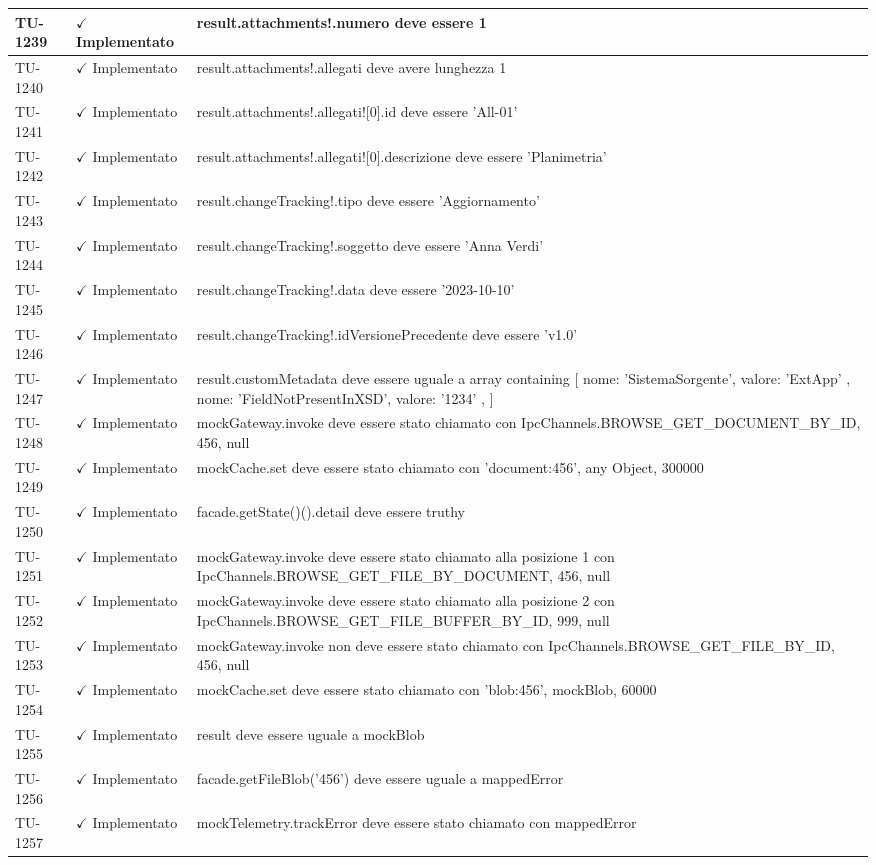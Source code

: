﻿\documentclass[a4paper,12pt]{article}
\newcommand{\ok}{\textcolor{green!60!black}{$\checkmark$ Implementato}}
\begin{document}
\begin{longtable}{|p{2cm}|p{3.5cm}|p{9.5cm}|}
\hline
TU-1239 & \ok & result.attachments!.numero deve essere 1 \\
\hline
TU-1240 & \ok & result.attachments!.allegati deve avere lunghezza 1 \\
\hline
TU-1241 & \ok & result.attachments!.allegati![0].id deve essere 'All-01' \\
\hline
TU-1242 & \ok & result.attachments!.allegati![0].descrizione deve essere 'Planimetria' \\
\hline
TU-1243 & \ok & result.changeTracking!.tipo deve essere 'Aggiornamento' \\
\hline
TU-1244 & \ok & result.changeTracking!.soggetto deve essere 'Anna Verdi' \\
\hline
TU-1245 & \ok & result.changeTracking!.data deve essere '2023-10-10' \\
\hline
TU-1246 & \ok & result.changeTracking!.idVersionePrecedente deve essere 'v1.0' \\
\hline
TU-1247 & \ok & result.customMetadata deve essere uguale a array containing [ { nome: 'SistemaSorgente', valore: 'ExtApp' }, { nome: 'FieldNotPresentInXSD', valore: '1234' }, ] \\
\hline
TU-1248 & \ok & mockGateway.invoke deve essere stato chiamato con IpcChannels.BROWSE\_GET\_DOCUMENT\_BY\_ID, 456, null \\
\hline
TU-1249 & \ok & mockCache.set deve essere stato chiamato con 'document:456', any Object, 300000 \\
\hline
TU-1250 & \ok & facade.getState()().detail deve essere truthy \\
\hline
TU-1251 & \ok & mockGateway.invoke deve essere stato chiamato alla posizione 1 con IpcChannels.BROWSE\_GET\_FILE\_BY\_DOCUMENT, 456, null \\
\hline
TU-1252 & \ok & mockGateway.invoke deve essere stato chiamato alla posizione 2 con IpcChannels.BROWSE\_GET\_FILE\_BUFFER\_BY\_ID, 999, null \\
\hline
TU-1253 & \ok & mockGateway.invoke non deve essere stato chiamato con IpcChannels.BROWSE\_GET\_FILE\_BY\_ID, 456, null \\
\hline
TU-1254 & \ok & mockCache.set deve essere stato chiamato con 'blob:456', mockBlob, 60000 \\
\hline
TU-1255 & \ok & result deve essere uguale a mockBlob \\
\hline
TU-1256 & \ok & facade.getFileBlob('456') deve essere uguale a mappedError \\
\hline
TU-1257 & \ok & mockTelemetry.trackError deve essere stato chiamato con mappedError \\

\end{longtable}
\end{document}
